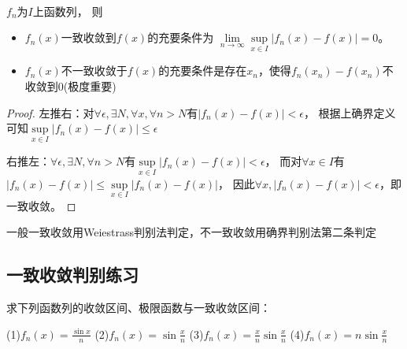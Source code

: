 ~

\begin{theorem}[确界判别法]
  $f_n$为$I$上函数列，
  则
  \begin{itemize}
  \item 
    $f_n(x)$一致收敛到$f(x)$的充要条件为
    $\lim \limits _{n \rightarrow \infty} \sup \limits_{x \in I}|f_n(x) - f(x)| = 0$。
  \item 
    $f_n(x)$不一致收敛于$f(x)$的充要条件是存在$x_n$，使得$f_n(x_n) - f(x_n)$不收敛到$0$(极度重要)
  \end{itemize}
\end{theorem}

\begin{proof}
  左推右：对$\forall \epsilon, \exists N, \forall x, \forall n > N$有$|f_n(x) - f(x)| < \epsilon$，
  根据上确界定义可知$\sup \limits_{x \in I}|f_n(x) - f(x)| \leq \epsilon$

  右推左：$\forall \epsilon, \exists N, \forall n > N$有$\sup \limits_{x \in I}|f_n(x) - f(x)| < \epsilon$，
  而对$\forall x \in I$有$|f_n(x) - f(x)| \leq \sup \limits_{x \in I}|f_n(x) - f(x)|$，
  因此$\forall x , |f_n(x) - f(x)| < \epsilon$，即一致收敛。
\end{proof}

\begin{note}
  一般一致收敛用Weiestrass判别法判定，不一致收敛用确界判别法第二条判定
\end{note}

\subsection{一致收敛判别练习}

\begin{exercise}[三角相关]
  求下列函数列的收敛区间、极限函数与一致收敛区间：

  (1)$f_n(x) = \frac{\sin x}{n}$
  (2)$f_n(x) = \sin \frac{x}{n}$
  (3)$f_n(x) = \frac{x}{n} \sin \frac{x}{n}$
  (4)$f_n(x) = n \sin \frac{x}{n}$
\end{exercise}

